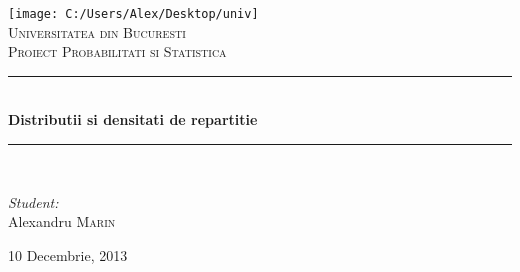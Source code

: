 \documentclass[pdftex,12pt,a4paper]{report}
\newcommand{\HRule}{\rule{\linewidth}{0.5mm}}
\begin{document}
\begin{titlepage}
\begin{center}

\texttt{[image: C:/Users/Alex/Desktop/univ]}~\\[1cm]

\textsc{\LARGE Universitatea din Bucuresti}\\[1.5cm]
\textsc{\Large Proiect Probabilitati si Statistica}\\[0.5cm]

\HRule \\[0.4cm]
{ \huge \bfseries Distributii si densitati de repartitie \\[0.4cm]}
\HRule \\[1.5cm]

\begin{minipage}{0.4\textwidth}
\begin{flushleft} \large
\emph{Student:}\\
Alexandru \textsc{Marin}
\end{flushleft}
\end{minipage}
\begin{minipage}{0.4\textwidth}
\begin{flushright} \large

\end{flushright}
\end{minipage}

\vfill

{\large \begin{center}
10 Decembrie, 2013\end{center}}

\end{center}
\end{titlepage}
\end{document}
